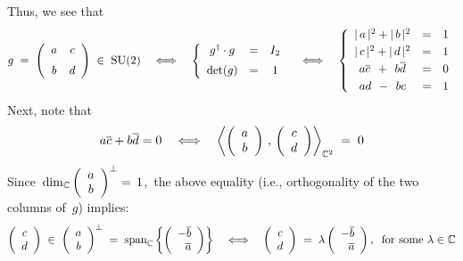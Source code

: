 Thus, we see that
\begin{equation*}
g
\; = \;
	\left(\begin{array}{cc}
		a & c
		\\
		\overset{{\color{white}-}}{b} & d
		\end{array}\right)
\;\in\;
	\textnormal{SU}(2)
\quad\Longleftrightarrow\quad
\left\{
	\begin{array}{ccc}
		g^{\dagger} \cdot g &=& I_{2}
		\\
		\det(g) &=& \overset{{\color{white}1}}{1}
		\end{array}
		\right.
\quad\Longleftrightarrow\quad
\left\{
	\begin{array}{ccc}
	\vert\,a\,\vert^{2} + \vert\,b\,\vert^{2} &=& 1
	\\
	\vert\,c\,\vert^{2} + \vert\,d\,\vert^{2} &\overset{{\color{white}1}}{=}& 1
	\\
	a\overline{c} \;\, + \,\; b\overline{d} &\overset{{\color{white}1}}{=}& 0
	\\
	ad \;\, - \,\; bc &\overset{{\color{white}1}}{=}& 1
	\end{array}
	\right.
\end{equation*}
Next, note that
\begin{equation*}
a\overline{c} + b\overline{d} = 0
\quad\Longleftrightarrow\quad
	\left\langle
		\left(\begin{array}{c} a \\ b \end{array}\right)
		\,,\,
		\left(\begin{array}{c} c \\ d \end{array}\right)
		\right\rangle_{\mathbb{C}^{2}}
	\;=\;
	0
\end{equation*}
Since
\,$\dim_{\mathbb{C}}\left(\begin{array}{c} a \\ b \end{array}\right)^{\perp} =\, 1$,\,
the above equality (i.e., orthogonality of the two columns of \,$g$) implies:
\begin{equation*}
\left(\begin{array}{c} c \\ d \end{array}\right)
\; \in \;
	\left(\begin{array}{c} a \\ b \end{array}\right)^{\perp}
\; = \;
	\textnormal{span}_{\mathbb{C}}\left\{
		\left(\begin{array}{r} -\overline{b} \\ \overline{a} \end{array}\right)
		\right\}
\quad\Longleftrightarrow\quad
\left(\begin{array}{c} c \\ d \end{array}\right)
\; = \;
	\lambda \left(\begin{array}{r} -\overline{b} \\ \overline{a} \end{array}\right),
	\;\;
	\textnormal{for some $\lambda \in \mathbb{C}$}
\end{equation*}
